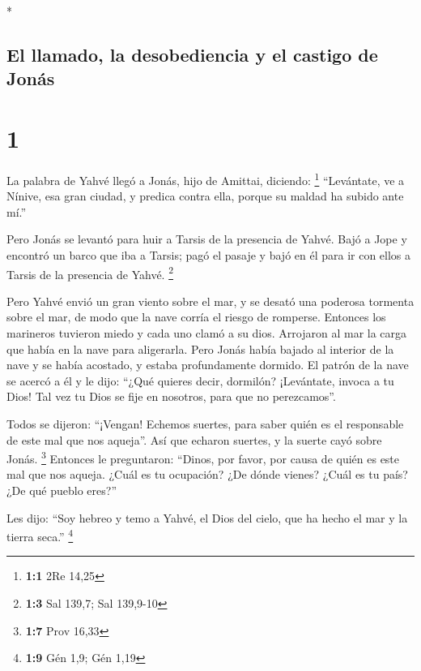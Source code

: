 \begin{paracol}{2} \switchcolumn[0]*

\hypertarget{el-llamado-la-desobediencia-y-el-castigo-de-jonuxe1s}{%
\subsection{El llamado, la desobediencia y el castigo de
Jonás}\label{el-llamado-la-desobediencia-y-el-castigo-de-jonuxe1s}}

\hypertarget{section}{%
\section{1}\label{section}}

 La palabra de Yahvé llegó a Jonás, hijo de Amittai,
diciendo: \footnote{\textbf{1:1} 2Re 14,25}  ``Levántate,
ve a Nínive, esa gran ciudad, y predica contra ella, porque su maldad ha
subido ante mí.''

 Pero Jonás se levantó para huir a Tarsis de la presencia
de Yahvé. Bajó a Jope y encontró un barco que iba a Tarsis; pagó el
pasaje y bajó en él para ir con ellos a Tarsis de la presencia de Yahvé.
\footnote{\textbf{1:3} Sal 139,7; Sal 139,9-10}

 Pero Yahvé envió un gran viento sobre el mar, y se desató
una poderosa tormenta sobre el mar, de modo que la nave corría el riesgo
de romperse.  Entonces los marineros tuvieron miedo y cada
uno clamó a su dios. Arrojaron al mar la carga que había en la nave para
aligerarla. Pero Jonás había bajado al interior de la nave y se había
acostado, y estaba profundamente dormido.  El patrón de la
nave se acercó a él y le dijo: ``¿Qué quieres decir, dormilón?
¡Levántate, invoca a tu Dios! Tal vez tu Dios se fije en nosotros, para
que no perezcamos''.

 Todos se dijeron: ``¡Vengan! Echemos suertes, para saber
quién es el responsable de este mal que nos aqueja''. Así que echaron
suertes, y la suerte cayó sobre Jonás. \footnote{\textbf{1:7} Prov 16,33}
 Entonces le preguntaron: ``Dinos, por favor, por causa de
quién es este mal que nos aqueja. ¿Cuál es tu ocupación? ¿De dónde
vienes? ¿Cuál es tu país? ¿De qué pueblo eres?''

 Les dijo: ``Soy hebreo y temo a Yahvé, el Dios del cielo,
que ha hecho el mar y la tierra seca.'' \footnote{\textbf{1:9} Gén 1,9;
  Gén 1,19}


\end{paracol}
